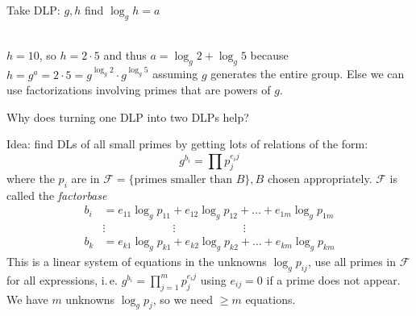 Take \textsc{DLP}: $g, h$ find $\log_g h = a$

\begin{example} \ \\
$h = 10$, so $h = 2 \cdot 5$ and thus $a = \log_g 2 + \log_g 5$ because $h= g^a = 2 \cdot 5 = g^{\log_g 2} \cdot g^{\log_g 5}$ assuming $g$ generates the entire group. Else we can use factorizations involving primes that are powers of $g$.
\end{example}

Why does turning one \textsc{DLP} into two \textsc{DLP}s help?

Idea: find \textsc{DL}s of all small primes by getting lots of relations of the form:
\[ g^{b_i} = \prod p_j^{e_ij} \]
where the $p_i$ are in $\mathcal{F} = \{ \text{primes smaller than } B\}, B$ chosen appropriately. $\mathcal{F}$ is called the \emph{factorbase}
\begin{align*}
b_i &= e_{11} \log_g p_{11} + e_{12} \log_g p_{12} + \dots + e_{1m} \log_g p_{1m} \\
 &\vdots \qquad \qquad \qquad \vdots \qquad \qquad \qquad \vdots \\
b_k &= e_{k1} \log_g p_{k1} + e_{k2} \log_g p_{k2} + \dots + e_{km} \log_g p_{km}
\end{align*}
This is a linear system of equations in the unknowns $\log_g p_{ij}$, use all primes in $\mathcal{F}$ for all expressions, i.\,e. $g^{b_i} = \prod\limits_{j=1}^m p_j^{e_ij}$ using $e_{ij} = 0$ if a prime does not appear. We have $m$ unknowns $\log_g p_j$, so we need $\geq m$ equations.

